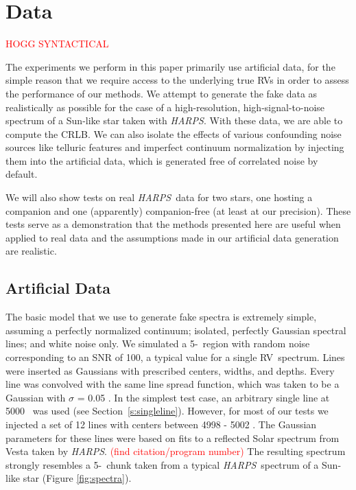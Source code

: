 \documentclass[modern]{aastex631}
\newcommand{\ang}{\text{\normalfont\AA}}
\newcommand{\sectionname}{Section}
\newcommand{\todo}[1]{\textcolor{red}{#1}}  %
\newcommand{\acronym}[1]{{\small{#1}}}
\newcommand{\project}[1]{\textsl{#1}}
\newcommand{\HARPS}{\project{\acronym{HARPS}}}
\newcommand{\RV}{\acronym{RV}}
\newcommand{\CRLB}{\acronym{CRLB}}
\begin{document}
\section{Data}
\label{s:data}

\todo{HOGG SYNTACTICAL}

The experiments we perform in this paper primarily use artificial data, for the simple reason that we require access to the underlying true RVs in order to assess the performance of our methods. 
We attempt to generate the fake data as realistically as possible for the case of a high-resolution, high-signal-to-noise spectrum of a Sun-like star taken with \HARPS. 
With these data, we are able to compute the \CRLB.  
We can also isolate the effects of various confounding noise sources like telluric features and imperfect continuum normalization by injecting them into the artificial data, which is generated free of correlated noise by default.

We will also show tests on real \HARPS\ data for two stars, one hosting a companion and
one (apparently) companion-free (at least at our precision). 
These tests serve as a demonstration that the methods presented here are useful when applied to real data and the assumptions made in our artificial data generation are realistic.

\subsection{Artificial Data}

The basic model that we use to generate fake spectra is extremely simple, assuming a perfectly normalized continuum; isolated, perfectly Gaussian spectral lines; and white noise only. 
We simulated a 5-\ang\ region with random noise corresponding to an SNR of 100, a typical value for a single \RV\ spectrum. 
Lines were inserted as Gaussians with prescribed centers, widths, and depths. 
Every line was convolved with the same line spread function, which was taken to be a Gaussian with $\sigma$ = 0.05 \ang. 
In the simplest test case, an arbitrary single line at 5000 \ang\ was used (see \sectionname~\ref{s:singleline}). 
However, for most of our tests we injected a set of 12 lines with centers between 4998 - 5002 \ang. 
The Gaussian parameters for these lines were based on fits to a reflected Solar spectrum from Vesta taken by \HARPS. \todo{(find citation/program number)} 
The resulting spectrum strongly resembles a 5-\ang\ chunk taken from a typical \HARPS\ spectrum of a Sun-like star (Figure \ref{fig:spectra}).
\end{document}
